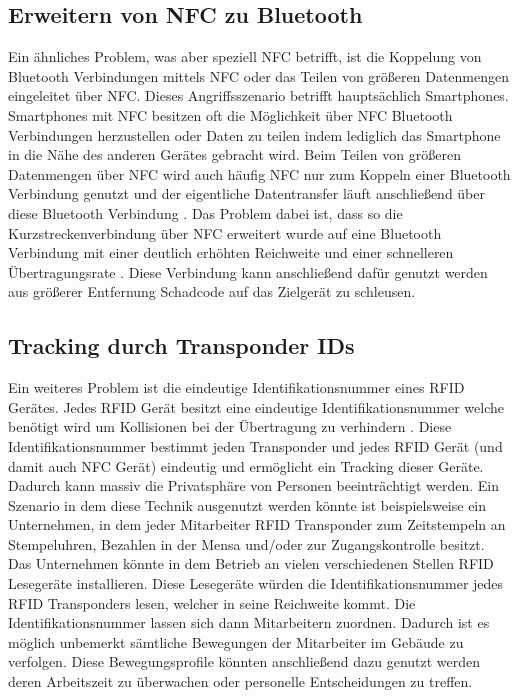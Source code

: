 \documentclass[conference]{IEEEtran}
\begin{document}
\subsection{Erweitern von NFC zu Bluetooth}
Ein ähnliches Problem, was aber speziell NFC betrifft, ist die Koppelung von Bluetooth Verbindungen mittels NFC oder das Teilen von größeren Datenmengen eingeleitet über NFC. Dieses Angriffsszenario betrifft hauptsächlich Smartphones. Smartphones mit NFC besitzen oft die Möglichkeit über NFC Bluetooth Verbindungen herzustellen oder Daten zu teilen indem lediglich das Smartphone in die Nähe des anderen Gerätes gebracht wird. Beim Teilen von größeren Datenmengen über NFC wird auch häufig NFC nur zum Koppeln einer Bluetooth Verbindung genutzt und der eigentliche Datentransfer läuft anschließend über diese Bluetooth Verbindung \cite{b6}. Das Problem dabei ist, dass so die Kurzstreckenverbindung über NFC erweitert wurde auf eine Bluetooth Verbindung mit einer deutlich erhöhten Reichweite und einer schnelleren Übertragungsrate \cite{b6}. Diese Verbindung kann anschließend dafür genutzt werden aus größerer Entfernung Schadcode auf das Zielgerät zu schleusen.

\subsection{Tracking durch Transponder IDs}
Ein weiteres Problem ist die eindeutige Identifikationsnummer eines RFID Gerätes. Jedes RFID Gerät besitzt eine eindeutige Identifikationsnummer welche benötigt wird um Kollisionen bei der Übertragung zu verhindern \cite{b3}. Diese Identifikationsnummer bestimmt jeden Transponder und jedes RFID Gerät (und damit auch NFC Gerät) eindeutig und ermöglicht ein Tracking dieser Geräte. Dadurch kann massiv die Privatsphäre von Personen beeinträchtigt werden. Ein Szenario in dem diese Technik ausgenutzt werden könnte ist beispielsweise ein Unternehmen, in dem jeder Mitarbeiter RFID Transponder zum Zeitstempeln an Stempeluhren, Bezahlen in der Mensa und/oder zur Zugangskontrolle besitzt. Das Unternehmen könnte in dem Betrieb an vielen verschiedenen Stellen RFID Lesegeräte installieren. Diese Lesegeräte würden die Identifikationsnummer jedes RFID Transponders lesen, welcher in seine Reichweite kommt. Die Identifikationsnummer lassen sich dann Mitarbeitern zuordnen. Dadurch ist es möglich unbemerkt sämtliche Bewegungen der Mitarbeiter im Gebäude zu verfolgen. Diese Bewegungsprofile könnten anschließend dazu genutzt werden deren Arbeitszeit zu überwachen oder personelle Entscheidungen zu treffen.
\end{document}
